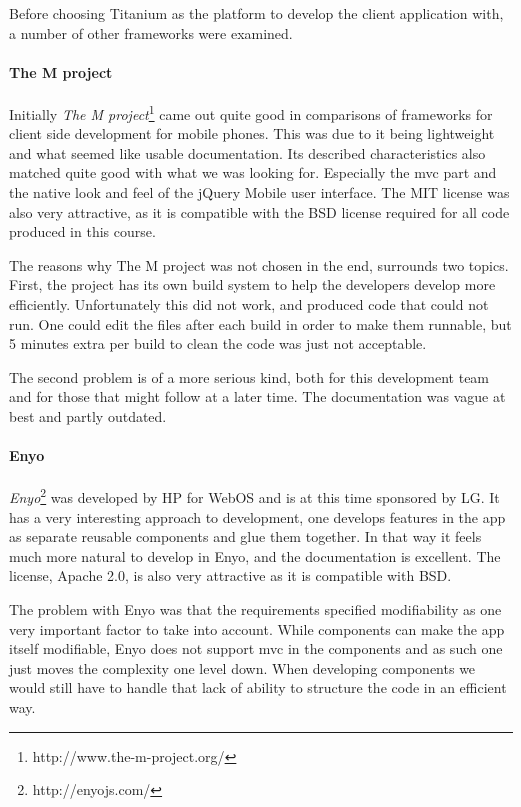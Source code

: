 \documentclass[11pt]{book}
\begin{document}
Before choosing Titanium as the platform to develop the client application with, a number of other frameworks were examined.

\paragraph{The M project}
Initially \emph{The M project}\footnote{http://www.the-m-project.org/} came out quite good in comparisons of frameworks for client side development for mobile phones. This was due to it being lightweight and what seemed like usable documentation. Its described characteristics also matched quite good with what we was looking for. Especially the \gls{mvc} part and the native look and feel of the jQuery Mobile user interface. The MIT license was also very attractive, as it is compatible with the BSD license required for all code produced in this course.

The reasons why The M project was not chosen in the end, surrounds two topics. First, the project has its own build system to help the developers develop more efficiently. Unfortunately this did not work, and produced code that could not run. One could edit the files after each build in order to make them runnable, but 5 minutes extra per build to clean the code was just not acceptable.

The second problem is of a more serious kind, both for this development team and for those that might follow at a later time. The documentation was vague at best and partly outdated.

\paragraph{Enyo}
\emph{Enyo}\footnote{http://enyojs.com/} was developed by HP for WebOS and is at this time sponsored by LG.\cite{enyoHistory} It has a very interesting approach to development, one develops features in the app as separate reusable components and glue them together. In that way it feels much more natural to develop in Enyo, and the documentation is excellent. The license, Apache 2.0, is also very attractive as it is compatible with BSD.

The problem with Enyo was that the requirements specified modifiability as one very important factor to take into account. While components can make the app itself modifiable, Enyo does not support \gls{mvc} in the components and as such one just moves the complexity one level down. When developing components we would still have to handle that lack of ability to structure the code in an efficient way.
\end{document}
